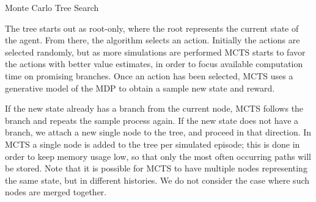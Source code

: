 \begin{algorithm}[H]
\begin{multicols}{2}
    \caption{Monte Carlo Tree Search}


    \setcounter{AlgoLine}{0}

    \setcounter{AlgoLine}{0}

\end{multicols}
\end{algorithm}

The tree starts out as root-only, where the root represents the current state of the agent. From
there, the algorithm selects an action. Initially the actions are selected randomly, but as more
simulations are performed MCTS starts to favor the actions with better value estimates, in order to
focus available computation time on promising branches. Once an action has been selected, MCTS uses
a generative model of the MDP to obtain a sample new state and reward.

If the new state already has a branch from the current node, MCTS follows the branch and repeats the
sample process again. If the new state does not have a branch, we attach a new single node to the
tree, and proceed in that direction. In MCTS a single node is added to the tree per simulated
episode; this is done in order to keep memory usage low, so that only the most often occurring paths will
be stored. Note that it is possible for MCTS to have multiple nodes representing the same state, but
in different histories. We do not consider the case where such nodes are merged together.


